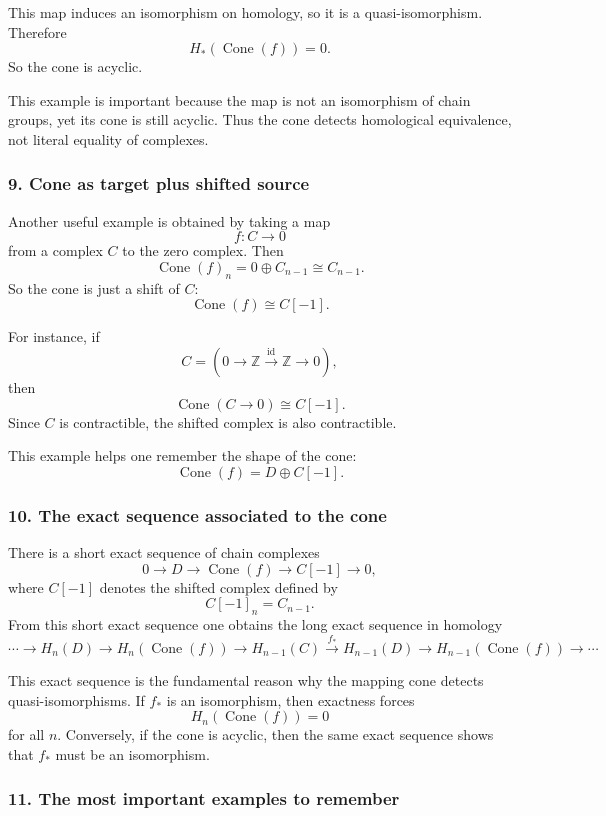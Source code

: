 \documentclass[12pt,a4paper]{article}
\theoremstyle{notespace}
\begin{document}
This map induces an isomorphism on homology, so it is a quasi-isomorphism. Therefore
\[
H_*(\operatorname{Cone}(f))=0.
\]
So the cone is acyclic.

This example is important because the map is not an isomorphism of chain groups, yet its cone is still acyclic. Thus the cone detects homological equivalence, not literal equality of complexes.

\subsubsection*{9. Cone as target plus shifted source}

Another useful example is obtained by taking a map
\[
f:C\to 0
\]
from a complex \(C\) to the zero complex. Then
\[
\operatorname{Cone}(f)_n=0\oplus C_{n-1}\cong C_{n-1}.
\]
So the cone is just a shift of \(C\):
\[
\operatorname{Cone}(f)\cong C[-1].
\]

For instance, if
\[
C=
\left(0\to \mathbb Z \xrightarrow{\mathrm{id}} \mathbb Z \to 0\right),
\]
then
\[
\operatorname{Cone}(C\to 0)\cong C[-1].
\]
Since \(C\) is contractible, the shifted complex is also contractible.

This example helps one remember the shape of the cone:
\[
\operatorname{Cone}(f)=D\oplus C[-1].
\]

\subsubsection*{10. The exact sequence associated to the cone}

There is a short exact sequence of chain complexes
\[
0\longrightarrow D \longrightarrow \operatorname{Cone}(f)\longrightarrow C[-1]\longrightarrow 0,
\]
where \(C[-1]\) denotes the shifted complex defined by
\[
C[-1]_n=C_{n-1}.
\]
From this short exact sequence one obtains the long exact sequence in homology
\[
\cdots \to H_n(D)\to H_n(\operatorname{Cone}(f))\to H_{n-1}(C)\xrightarrow{\,f_*\,} H_{n-1}(D)\to H_{n-1}(\operatorname{Cone}(f))\to\cdots
\]

This exact sequence is the fundamental reason why the mapping cone detects quasi-isomorphisms. If \(f_*\) is an isomorphism, then exactness forces
\[
H_n(\operatorname{Cone}(f))=0
\]
for all \(n\). Conversely, if the cone is acyclic, then the same exact sequence shows that \(f_*\) must be an isomorphism.

\subsubsection*{11. The most important examples to remember}
\end{document}

